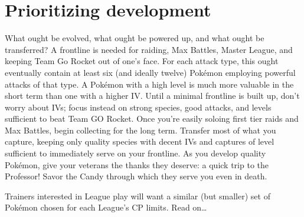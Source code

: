 \section{Prioritizing development}
\label{sec:developmentpriority}
What ought be evolved, what ought be powered up, and what ought be transferred?
A frontline is needed for raiding, Max Battles, Master League, and keeping Team Go Rocket out of one's face.
For each attack type, this ought eventually contain at least six (and ideally twelve) Pokémon
  employing powerful attacks of that type.
A Pokémon with a high level is much more valuable in the short term than one with a higher IV.
Until a minimal frontline is built up, don't worry about IVs; focus instead on strong species,
  good attacks, and levels sufficient to beat Team GO Rocket.
Once you're easily soloing first tier raids and Max Battles, begin collecting for the long term.
Transfer most of what you capture, keeping only quality species with decent IVs
  and captures of level sufficient to immediately serve on your frontline.
As you develop quality Pokémon, give your veterans the thanks they deserve: a quick trip to the Professor!
Savor the Candy through which they serve you even in death.

Trainers interested in League play will want a similar (but smaller) set of Pokémon chosen for each League's CP limits.
Read on\ldots
